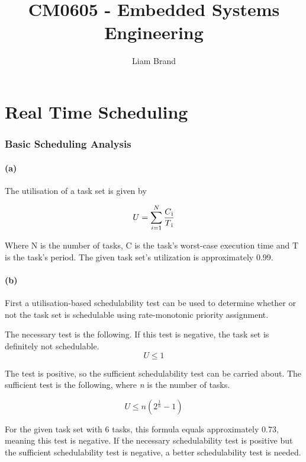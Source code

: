 \documentclass[]{report}
\title{CM0605 - Embedded Systems Engineering}
\author{Liam Brand}
\date{}
\begin{document}
\maketitle

	\chapter{Real Time Scheduling}
		\subsection{Basic Scheduling Analysis}
			\subsubsection{(a)}
			The utilisation of a task set is given by
			
			\begin{equation*}
				U = \sum_{i=1}^{N} \frac{C\textsubscript{i}}{T\textsubscript{i}}
			\end{equation*}
			
			Where N is the number of tasks, C is the task's worst-case execution time and T is the task's period. The given task set's utilization is approximately 0.99.
			
			\subsubsection{(b)}
			First a utilisation-based schedulability test can be used to determine whether or not the task set is schedulable using rate-monotonic priority assignment.
			
			The necessary test is the following. If this test is negative, the task set is definitely not schedulable.
			\begin{equation*}
			U \leq 1
			\end{equation*}
			
			The test is positive, so the sufficient schedulability test can be carried about. The sufficient test is the following, where \textit{n} is the number of tasks.
			
			\begin{equation*}
			U \leq n(2^\frac{1}{n} - 1)
			\end{equation*}
			
			For the given task set with 6 tasks, this formula equals approximately 0.73, meaning this test is negative. If the necessary schedulability test is positive but the sufficient schedulability test is negative, a better schedulability test is needed. 
			
\end{document}
